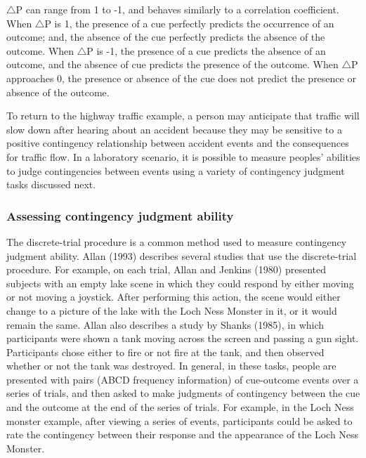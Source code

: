 \documentclass[
  english,
  man,floatsintext]{apa6}
\begin{document}
\(\triangle\)P can range from 1 to -1, and behaves similarly to a correlation coefficient. When \(\triangle\)P is 1, the presence of a cue perfectly predicts the occurrence of an outcome; and, the absence of the cue perfectly predicts the absence of the outcome. When \(\triangle\)P is -1, the presence of a cue predicts the absence of an outcome, and the absence of cue predicts the presence of the outcome. When \(\triangle\)P approaches 0, the presence or absence of the cue does not predict the presence or absence of the outcome.

To return to the highway traffic example, a person may anticipate that traffic will slow down after hearing about an accident because they may be sensitive to a positive contingency relationship between accident events and the consequences for traffic flow. In a laboratory scenario, it is possible to measure peoples' abilities to judge contingencies between events using a variety of contingency judgment tasks discussed next.

\hypertarget{assessing-contingency-judgment-ability}{%
\subsubsection{Assessing contingency judgment ability}\label{assessing-contingency-judgment-ability}}

The discrete-trial procedure is a common method used to measure contingency judgment ability. Allan (1993) describes several studies that use the discrete-trial procedure. For example, on each trial, Allan and Jenkins (1980) presented subjects with an empty lake scene in which they could respond by either moving or not moving a joystick. After performing this action, the scene would either change to a picture of the lake with the Loch Ness Monster in it, or it would remain the same. Allan also describes a study by Shanks (1985), in which participants were shown a tank moving across the screen and passing a gun sight. Participants chose either to fire or not fire at the tank, and then observed whether or not the tank was destroyed. In general, in these tasks, people are presented with pairs (ABCD frequency information) of cue-outcome events over a series of trials, and then asked to make judgments of contingency between the cue and the outcome at the end of the series of trials. For example, in the Loch Ness monster example, after viewing a series of events, participants could be asked to rate the contingency between their response and the appearance of the Loch Ness Monster.
\end{document}
